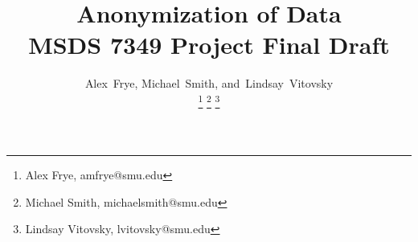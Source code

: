 \documentclass[10pt,journal,compsoc]{IEEEtran}
\begin{document}
%
\title{Anonymization of Data\\MSDS 7349 Project Final Draft}
%
%
%
%

\author{Alex~Frye,
        Michael~Smith,
        and~Lindsay~Vitovsky%
\protect\\

\thanks{Alex Frye, amfrye@smu.edu} \thanks{Michael Smith, michaelsmith@smu.edu} \thanks {Lindsay Vitovsky, lvitovsky@smu.edu}}
\end{document}
